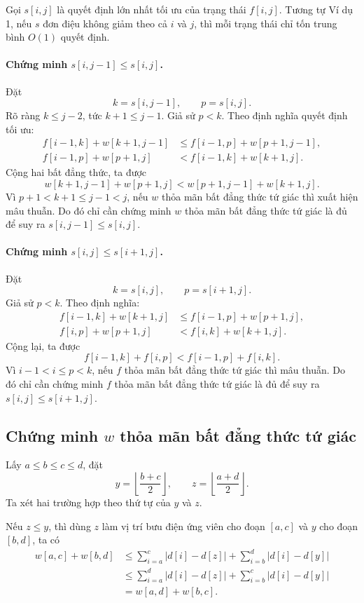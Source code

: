 \documentclass[11pt]{article}
\begin{document}
Gọi $s[i,j]$ là quyết định lớn nhất tối ưu của trạng thái $f[i,j]$. Tương tự
Ví dụ 1, nếu $s$ đơn điệu không giảm theo cả $i$ và $j$, thì mỗi trạng thái
chỉ tốn trung bình $O(1)$ quyết định.

\paragraph{Chứng minh $s[i,j-1]\le s[i,j]$.}
Đặt
\[
  k=s[i,j-1],\qquad p=s[i,j].
\]
Rõ ràng $k\le j-2$, tức $k+1\le j-1$. Giả sử $p<k$. Theo định nghĩa quyết
định tối ưu:
\[
\begin{aligned}
  f[i-1,k]+w[k+1,j-1]
  &\le f[i-1,p]+w[p+1,j-1],\\
  f[i-1,p]+w[p+1,j]
  &< f[i-1,k]+w[k+1,j].
\end{aligned}
\]
Cộng hai bất đẳng thức, ta được
\[
  w[k+1,j-1]+w[p+1,j]
  < w[p+1,j-1]+w[k+1,j].
\]
Vì $p+1<k+1\le j-1<j$, nếu $w$ thỏa mãn bất đẳng thức tứ giác thì xuất hiện
mâu thuẫn. Do đó chỉ cần chứng minh $w$ thỏa mãn bất đẳng thức tứ giác là đủ
để suy ra $s[i,j-1]\le s[i,j]$.

\paragraph{Chứng minh $s[i,j]\le s[i+1,j]$.}
Đặt
\[
  k=s[i,j],\qquad p=s[i+1,j].
\]
Giả sử $p<k$. Theo định nghĩa:
\[
\begin{aligned}
  f[i-1,k]+w[k+1,j]
  &\le f[i-1,p]+w[p+1,j],\\
  f[i,p]+w[p+1,j]
  &< f[i,k]+w[k+1,j].
\end{aligned}
\]
Cộng lại, ta được
\[
  f[i-1,k]+f[i,p]<f[i-1,p]+f[i,k].
\]
Vì $i-1<i\le p<k$, nếu $f$ thỏa mãn bất đẳng thức tứ giác thì mâu thuẫn. Do
đó chỉ cần chứng minh $f$ thỏa mãn bất đẳng thức tứ giác là đủ để suy ra
$s[i,j]\le s[i+1,j]$.

\subsection*{Chứng minh $w$ thỏa mãn bất đẳng thức tứ giác}

Lấy $a\le b\le c\le d$, đặt
\[
  y=\left\lfloor\frac{b+c}{2}\right\rfloor,\qquad
  z=\left\lfloor\frac{a+d}{2}\right\rfloor.
\]
Ta xét hai trường hợp theo thứ tự của $y$ và $z$.

Nếu $z\le y$, thì dùng $z$ làm vị trí bưu điện ứng viên cho đoạn $[a,c]$ và
$y$ cho đoạn $[b,d]$, ta có
\[
\begin{aligned}
  w[a,c]+w[b,d]
  &\le \sum_{i=a}^{c}|d[i]-d[z]|
       +\sum_{i=b}^{d}|d[i]-d[y]|\\
  &\le \sum_{i=a}^{d}|d[i]-d[z]|
       +\sum_{i=b}^{c}|d[i]-d[y]|\\
  &=w[a,d]+w[b,c].
\end{aligned}
\]
\end{document}
